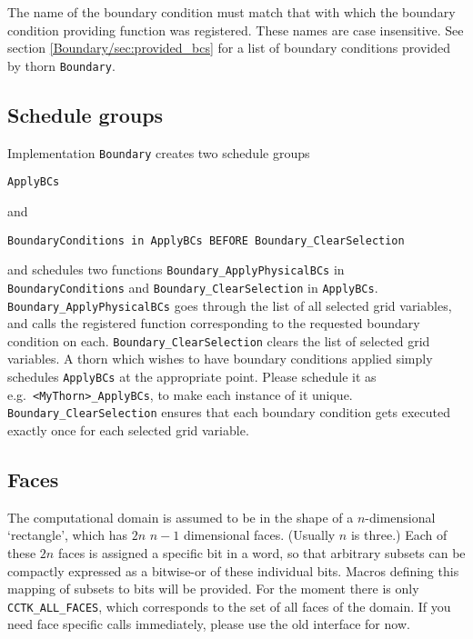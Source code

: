 \documentclass{article}
\begin{document}
The name of the boundary condition must match that with which the
boundary condition providing function was registered.  These names are
case insensitive.  See section \ref{Boundary/sec:provided_bcs} for a list of
boundary conditions provided by thorn \texttt{Boundary}.


\subsection{Schedule groups}
\label{Boundary/sec:schedule_groups}

Implementation \texttt{Boundary} creates two schedule groups
\begin{verbatim}
ApplyBCs
\end{verbatim}
and
\begin{verbatim}
BoundaryConditions in ApplyBCs BEFORE Boundary_ClearSelection
\end{verbatim}
and schedules two functions \texttt{Boundary\_ApplyPhysicalBCs} in
\texttt{BoundaryConditions} and \texttt{Boundary\_ClearSelection} in
\texttt{ApplyBCs}.  \texttt{Boundary\_ApplyPhysicalBCs} goes through
the list of all selected grid variables, and calls the registered
function corresponding to the requested boundary condition on each.
\texttt{Boundary\_ClearSelection} clears the list of selected grid
variables.  A thorn which wishes to have boundary conditions applied
simply schedules \texttt{ApplyBCs} at the appropriate point.  Please
schedule it as e.g.~\verb|<MyThorn>_ApplyBCs|, to make each instance
of it unique.
\texttt{Boundary\_ClearSelection} ensures that each boundary condition
gets executed exactly once for each selected grid variable.


\subsection{Faces}
\label{Boundary/sec:faces}

The computational domain is assumed to be in the shape of a
$n$-dimensional `rectangle', which has $2n$ $n-1$ dimensional faces.  (Usually $n$
is three.)  Each of these $2n$ faces is assigned a specific bit in a
word, so that arbitrary subsets can be compactly expressed as a
bitwise-or of these individual bits.  Macros defining this mapping of
subsets to bits will be provided.
For the moment there is only
\texttt{CCTK\_ALL\_FACES}, which corresponds to the set of all faces
of the domain.  If you need face specific calls immediately, please
use the old interface for now.  
\end{document}
